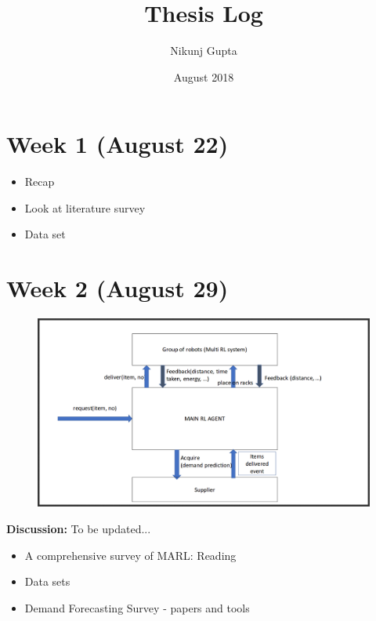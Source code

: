 \documentclass{article}
\title{Thesis Log}
\author{Nikunj Gupta}
\date{August 2018}
\begin{document}
\maketitle 
\section{Week 1 (August 22) } 
\begin{itemize}
	\item Recap 
	\item Look at literature survey 
	\item Data set 
\end{itemize}

\section{Week 2 (August 29)} 
\begin{figure}[h]
	\includegraphics[width=13.5cm]{workflow/workflow.png} 
	\centering 
\end{figure} 
\textbf{Discussion: } To be updated...

\begin{itemize}
	\item A comprehensive survey of MARL: Reading 
	\item Data sets 
	\item Demand Forecasting Survey - papers and tools 

\end{itemize}
\end{document}
